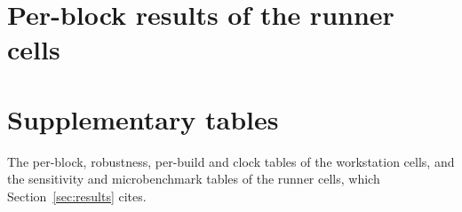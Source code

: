 \documentclass{article}
\newif\iffinal
\newif\ifresults
\newcommand{\pending}[1]{\iffinal\PackageError{paper}{Pending content: #1}{Fill it from the artifact before the final build.}\else\textcolor{red}{[PENDING: #1]}\fi}
\begin{document}
\section{Per-block results of the runner cells}
\label{app:runner-blocks}
\begin{table}[ht]
\centering
\caption{Every block of each runner cell: Elo with its 95\% half-width (50 pairs per block, 100 for RQ1c-R; blocks in dispatch order, each played on its own runner) and the cell's adjudicated draws and wins by its first and second arm. Generated by \texttt{make\_figures.py} from \texttt{games.pgn}.}
\label{tab:runner-blocks}
\footnotesize
\ifresults\resizebox{\linewidth}{!}{}\else{}\fi
\end{table}

\section{Supplementary tables}
\label{app:tables}
The per-block, robustness, per-build and clock tables of the workstation cells, and the sensitivity and microbenchmark tables of the runner cells, which Section~\ref{sec:results} cites.
\end{document}
